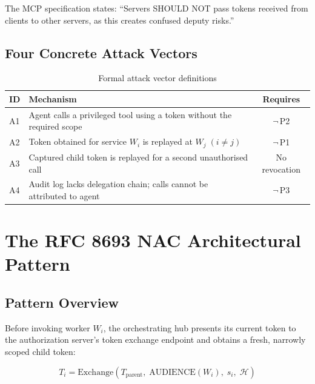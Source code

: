 \documentclass[journal]{IEEEtran}
\begin{document}
The MCP specification \cite{mcp_security} states: ``Servers SHOULD NOT pass
tokens received from clients to other servers, as this creates confused deputy
risks.''

\subsection{Four Concrete Attack Vectors}

\begin{table}[h]
\caption{Formal attack vector definitions}
\label{tab:attack_formal}
\centering
\footnotesize
\setlength{\tabcolsep}{3pt}
\begin{tabularx}{\columnwidth}{l X c}
\toprule
\textbf{ID} & \textbf{Mechanism} & \textbf{Requires} \\
\midrule
A1 & Agent calls a privileged tool using a token without the required scope
     & $\neg$\,P2 \\
A2 & Token obtained for service $W_i$ is replayed at $W_j\;(i\neq j)$
     & $\neg$\,P1 \\
A3 & Captured child token is replayed for a second unauthorised call
     & No revocation \\
A4 & Audit log lacks delegation chain; calls cannot be attributed to agent
     & $\neg$\,P3 \\
\bottomrule
\end{tabularx}
\end{table}


\section{The RFC 8693 NAC Architectural Pattern}
\label{sec:solution}

\subsection{Pattern Overview}

Before invoking worker $W_i$, the orchestrating hub presents its current token
to the authorization server's token exchange endpoint and obtains a fresh,
narrowly scoped child token:

\begin{equation}
T_i = \mathrm{Exchange}\!\left(
  T_{\mathrm{parent}},\;
  \mathrm{AUDIENCE}(W_i),\;
  s_i,\;
  \mathcal{H}
\right)
\label{eq:exchange}
\end{equation}
\end{document}

